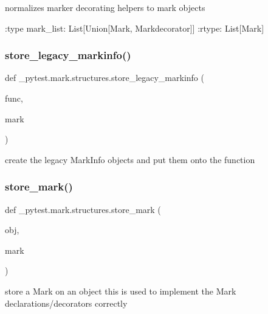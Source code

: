 \begin{DoxyVerb}normalizes marker decorating helpers to mark objects

:type mark_list: List[Union[Mark, Markdecorator]]
:rtype: List[Mark]
\end{DoxyVerb}
 \mbox{\label{namespace__pytest_1_1mark_1_1structures_ade88ff32dd0d753e2f85c33874ce2524}} 
\subsubsection{\texorpdfstring{store\+\_\+legacy\+\_\+markinfo()}{store\_legacy\_markinfo()}}
{\footnotesize\ttfamily def \+\_\+pytest.\+mark.\+structures.\+store\+\_\+legacy\+\_\+markinfo (\begin{DoxyParamCaption}\item[{}]{func,  }\item[{}]{mark }\end{DoxyParamCaption})}

\begin{DoxyVerb}create the legacy MarkInfo objects and put them onto the function
\end{DoxyVerb}
 \mbox{\label{namespace__pytest_1_1mark_1_1structures_a340a55efbd8c6ef26e78dc1f05b5790e}} 
\subsubsection{\texorpdfstring{store\+\_\+mark()}{store\_mark()}}
{\footnotesize\ttfamily def \+\_\+pytest.\+mark.\+structures.\+store\+\_\+mark (\begin{DoxyParamCaption}\item[{}]{obj,  }\item[{}]{mark }\end{DoxyParamCaption})}

\begin{DoxyVerb}store a Mark on an object
this is used to implement the Mark declarations/decorators correctly
\end{DoxyVerb}
 \mbox{\label{namespace__pytest_1_1mark_1_1structures_a441e941805d75e4a078a3345b94ba836}} 
